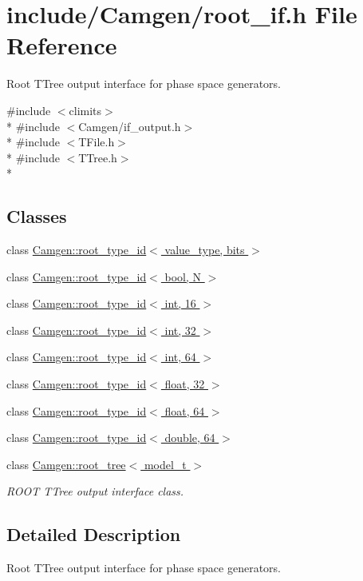 \hypertarget{a00732}{\section{include/\-Camgen/root\-\_\-if.h File Reference}
\label{a00732}
}


Root T\-Tree output interface for phase space generators.  


{\ttfamily \#include $<$climits$>$}\\*
{\ttfamily \#include $<$Camgen/if\-\_\-output.\-h$>$}\\*
{\ttfamily \#include $<$T\-File.\-h$>$}\\*
{\ttfamily \#include $<$T\-Tree.\-h$>$}\\*
\subsection*{Classes}
\begin{DoxyCompactItemize}
\item 
class \hyperlink{a00471}{Camgen\-::root\-\_\-type\-\_\-id$<$ value\-\_\-type, bits $>$}
\item 
class \hyperlink{a00472}{Camgen\-::root\-\_\-type\-\_\-id$<$ bool, N $>$}
\item 
class \hyperlink{a00476}{Camgen\-::root\-\_\-type\-\_\-id$<$ int, 16 $>$}
\item 
class \hyperlink{a00477}{Camgen\-::root\-\_\-type\-\_\-id$<$ int, 32 $>$}
\item 
class \hyperlink{a00478}{Camgen\-::root\-\_\-type\-\_\-id$<$ int, 64 $>$}
\item 
class \hyperlink{a00474}{Camgen\-::root\-\_\-type\-\_\-id$<$ float, 32 $>$}
\item 
class \hyperlink{a00475}{Camgen\-::root\-\_\-type\-\_\-id$<$ float, 64 $>$}
\item 
class \hyperlink{a00473}{Camgen\-::root\-\_\-type\-\_\-id$<$ double, 64 $>$}
\item 
class \hyperlink{a00470}{Camgen\-::root\-\_\-tree$<$ model\-\_\-t $>$}
\begin{DoxyCompactList}\small\item\em R\-O\-O\-T T\-Tree output interface class. \end{DoxyCompactList}\end{DoxyCompactItemize}


\subsection{Detailed Description}
Root T\-Tree output interface for phase space generators. 